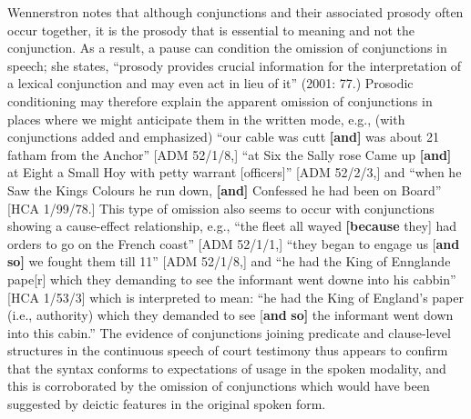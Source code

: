 Wennerstron notes that although conjunctions and their associated prosody often occur together, it is the prosody that is essential to meaning and not the conjunction. As a result, a pause can condition the omission of conjunctions in speech; she states, “prosody provides crucial information for the interpretation of a lexical conjunction and may even act in lieu of it” (2001: 77.) Prosodic conditioning may therefore explain the apparent omission of conjunctions in places where we might anticipate them in the written mode, e.g., (with conjunctions added and emphasized) “our cable was cutt \textbf{[and]} was about 21 fatham from the Anchor” [ADM 52/1/8,] “at Six the Sally rose Came up \textbf{[and]} at Eight a Small Hoy with petty warrant [officers]” [ADM 52/2/3,] and  “when he Saw the Kings Colours he run down, \textbf{[and]} Confessed he had been on Board” [HCA 1/99/78.] This type of omission also seems to occur with conjunctions showing a cause-effect relationship, e.g., “the fleet all wayed \textbf{[because} they] had orders to go on the French coast” [ADM 52/1/1,] “they began to engage us [\textbf{and} \textbf{so]} we fought them till 11” [ADM 52/1/8,] and “he had the King of Ennglande pape[r] which they demanding to see the informant went downe into his cabbin” [HCA 1/53/3] which is interpreted to mean: “he had the King of England’s paper (i.e., authority) which they demanded to see [\textbf{and} \textbf{so]} the informant went down into this cabin.” The evidence of conjunctions joining predicate and clause-level structures in the continuous speech of court testimony thus appears to confirm that the syntax conforms to expectations of usage in the spoken modality, and this is corroborated by the omission of conjunctions which would have been suggested by deictic features in the original spoken form. 

